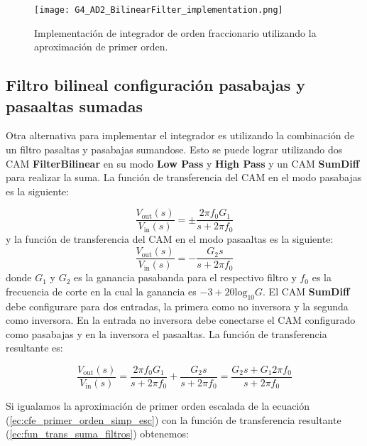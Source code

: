 \begin{figure}[!ht] 
\caption{Implementación de integrador de orden fraccionario utilizando la aproximación de primer orden.}
\label{fig:G4_AD2_BilinearFilter_implementation.png}
\centering
\texttt{[image: G4\_AD2\_BilinearFilter\_implementation.png]}
\end{figure}

	\subsection{Filtro bilineal configuración pasabajas y pasaaltas sumadas}

	Otra alternativa para implementar el integrador es utilizando la combinación de un filtro pasaltas y pasabajas sumandose. Esto se puede lograr utilizando dos CAM \textbf{FilterBilinear} en su modo \textbf{Low Pass} y \textbf{High Pass} y un CAM \textbf{SumDiff} para realizar la suma. La función de transferencia del CAM en el modo pasabajas es la siguiente:
	
	\begin{equation}
		\frac{V_{\mathrm{out}} (s)}{V_{\mathrm{in}}(s)} =  \pm \frac{2 \pi f_{0} G_{1}}{s + 2 \pi f_{0}}
		\label{ec:CAM_bilinear_pasabajas}
	\end{equation}
	y la función de transferencia del CAM en el modo pasaaltas es la siguiente:
	\begin{equation}
		\frac{V_{\mathrm{out}} (s)}{V_{\mathrm{in}}(s)} =  - \frac{ G_{2} s}{s + 2 \pi f_{0}}
		\label{ec:CAM_bilinear_pasaaltas}
	\end{equation}
	donde $G_{1}$ y $G_{2}$ es la ganancia pasabanda para el respectivo filtro y $f_{0}$ es la frecuencia de corte en la cual la ganancia es $-3 + 20 \mathrm{log}_{10}G$. El CAM \textbf{SumDiff} debe configurare para dos entradas, la primera como no inversora y la segunda como inversora. En la entrada no inversora debe conectarse el CAM configurado como pasabajas y en la inversora el pasaaltas. La función de transferencia resultante es:
	
	\begin{equation}
		\frac{V_{\mathrm{out}} (s)}{V_{\mathrm{in}}(s)} = \frac{2 \pi f_{0} G_{1}}{s + 2 \pi f_{0}} + \frac{ G_{2} s}{s + 2 \pi f_{0}} = \frac{G_{2}s + G_{1}2 \pi f_{0}}{s + 2 \pi f_{0}}
		\label{ec:fun_trans_suma_filtros}
	\end{equation}

	Si igualamos la aproximación de primer orden escalada de la ecuación (\ref{ec:cfe_primer_orden_simp_esc}) con la función de transferencia resultante (\ref{ec:fun_trans_suma_filtros}) obtenemos:
	
